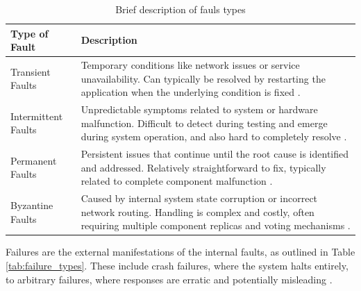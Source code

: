\begin{table}[h!]
    \centering
    \begin{tabular}{|l|p{11.3cm}|}
        \hline
        \textbf{Type of Fault} & \textbf{Description}                                                                                                                                                                               \\ \hline
        Transient Faults       & Temporary conditions like network issues or service unavailability. Can typically be resolved by restarting the application when the underlying condition is fixed \cite{Isukapalli2024}.          \\ \hline
        Intermittent Faults    & Unpredictable symptoms related to system or hardware malfunction. Difficult to detect during testing and emerge during system operation, and also hard to completely resolve \cite{Isukapalli2024}.   \\ \hline
        Permanent Faults       & Persistent issues that continue until the root cause is identified and addressed. Relatively straightforward to fix, typically related to complete component malfunction \cite{Tanenbaum2023}. \\ \hline
        Byzantine Faults       & Caused by internal system state corruption or incorrect network routing. Handling is complex and costly, often requiring multiple component replicas and voting mechanisms \cite{Isukapalli2024}.  \\ \hline
    \end{tabular}
    \caption{Brief description of fauls types}
    \label{tab:faults_types}
\end{table}

Failures are the external manifestations of the internal faults, as outlined in Table \ref{tab:failure_types}. These include crash failures, where the system halts entirely, to arbitrary failures, where responses are erratic and potentially misleading \cite{Tanenbaum2023}.

